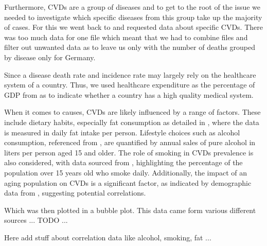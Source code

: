 Furthermore, CVDs are a group of diseases and to get to the root of the issue we needed to investigate which specific diseases from this group take up the majority of cases. For this we went back to \citep{GBD2019} and requested data about specific CVDs. There was too much data for one file which meant that we had to combine files and filter out unwanted data as to leave us only with the number of deaths grouped by disease only for Germany. 

Since a disease death rate and incidence rate may largely rely on the healthcare system of a country. Thus, we used healthcare expenditure as the percentage of GDP from \citep{health_expenditure} as to indicate whether a country has a high quality medical system.

When it comes to causes, CVDs are likely influenced by a range of factors. These include dietary habits, especially fat consumption as detailed in \citep{fat_consumption}, where the data is measured in daily fat intake per person. Lifestyle choices such as alcohol consumption, referenced from \citep{alcohol_consumption}, are quantified by annual sales of pure alcohol in liters per person aged 15 and older. The role of smoking in CVDs prevalence is also considered, with data sourced from \citep{smoking}, highlighting the percentage of the population over 15 years old who smoke daily. Additionally, the impact of an aging population on CVDs is a significant factor, as indicated by demographic data from \citep{age}, suggesting potential correlations.



Which was then plotted in a bubble plot. This data came form various different sources ... TODO ...

Here add stuff about correlation data like alcohol, smoking, fat ...